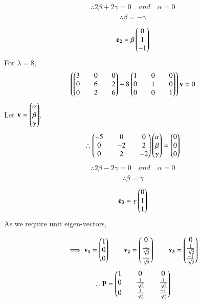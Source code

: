 \documentclass[journal]{IEEEtran}
\begin{document}
\begin{align}
    \therefore 2\beta+2\gamma=0 \quad and \quad \alpha=0
\end{align}
\begin{align}
    \therefore \beta=-\gamma
\end{align}
\begin{align}
    \mathbf{e_2}=\beta\begin{pmatrix}0\\1\\-1\end{pmatrix}
\end{align}
For $\lambda=8$,
\begin{align}
    \left(\begin{pmatrix}3&&0&&0\\0&&6&&2\\0&&2&&6\end{pmatrix}-8\begin{pmatrix}1&&0&&0\\0&&1&&0\\0&&0&&1\end{pmatrix}\right)\mathbf{v}=0
\end{align}
Let $\mathbf{v}=\begin{pmatrix}\alpha\\\beta\\\gamma\end{pmatrix}$.
\begin{align}
    \therefore \begin{pmatrix}-5&&0&&0\\0&&-2&&2\\0&&2&&-2\end{pmatrix}\begin{pmatrix}\alpha\\\beta\\\gamma\end{pmatrix}=\begin{pmatrix}0\\0\\0\end{pmatrix} 
\end{align}
\begin{align}
    \therefore 2\beta-2\gamma=0 \quad and \quad \alpha=0
\end{align}
\begin{align}
    \therefore \beta=\gamma
\end{align}
\begin{align}
    \mathbf{e_3}=\gamma \begin{pmatrix}0\\1\\1\end{pmatrix}
\end{align}
\newpage
\vspace*{0.25cm}
As we require unit eigen-vectors,

\begin{align}
    \implies \mathbf{v_1}=\begin{pmatrix}1\\0\\0\end{pmatrix} \qquad \mathbf{v_2}=\begin{pmatrix}0\\\frac{1}{\sqrt{2}}\\\frac{1}{\sqrt{2}}\end{pmatrix} \qquad \mathbf{v_3}=\begin{pmatrix}0\\\frac{1}{\sqrt{2}}\\\frac{-1}{\sqrt{2}}\end{pmatrix}
\end{align}
\begin{align}
    \therefore \mathbf{P}=\begin{pmatrix}1&&0&&0\\0&&\frac{1}{\sqrt{2}}&&\frac{1}{\sqrt{2}}\\0&&\frac{1}{\sqrt{2}}&&\frac{-1}{\sqrt{2}}\end{pmatrix}
\end{align}
\end{document}
